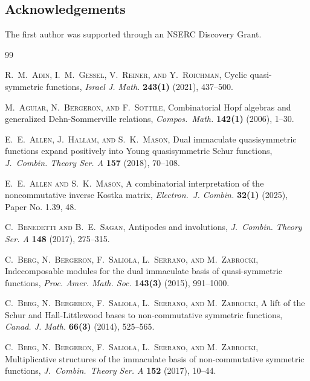 \documentclass{amsart}
\theoremstyle{definition}
\begin{document}
 \subsection*{Acknowledgements}
 The first author was supported through an NSERC Discovery Grant. 

\begin{thebibliography}{99}

 \textsc{R.\ M.\ Adin, I.\ M.\ Gessel, V.\ Reiner, and Y.\ Roichman}, 
 Cyclic quasi-symmetric functions, 
 \emph{Israel J. Math.} {\bf 243(1)} (2021), 437--500. 

 \textsc{M.\ Aguiar, N.\ Bergeron, and F.\ Sottile}, 
 Combinatorial {H}opf algebras and generalized {D}ehn-{S}ommerville relations, 
 \emph{Compos.\ Math.} {\bf 142(1)} (2006), 1--30. 

 \textsc{E.\ E.\ Allen, J.\ Hallam, and S.\ K.\ Mason}, 
 Dual immaculate quasisymmetric functions expand positively
 into {Y}oung quasisymmetric {S}chur functions, 
 \emph{J.\ Combin. Theory Ser. A} {\bf 157} (2018), 70--108. 

 \textsc{E.\ E.\ Allen and S.\ K.\ Mason}, 
 A combinatorial interpretation of the noncommutative inverse {K}ostka matrix, 
 \emph{Electron.\ J. Combin.} {\bf 32(1)} (2025), Paper No. 1.39, 48. 

 \textsc{C.\ Benedetti and B.\ E.\ Sagan}, 
 Antipodes and involutions, 
 \emph{J.\ Combin. Theory Ser. A} {\bf 148} (2017), 275--315. 

 \textsc{C.\ Berg, N.\ Bergeron, F.\ Saliola, L.\ Serrano, and M.\ Zabrocki}, 
 Indecomposable modules for the dual immaculate basis of
 quasi-symmetric functions, 
 \emph{Proc. Amer. Math. Soc.} {\bf 143(3)} (2015), 991--1000. 

 \textsc{C.\ Berg, N.\ Bergeron, F.\ Saliola, L.\ Serrano, and M.\ Zabrocki}, 
 A lift of the Schur and {H}all-{L}ittlewood bases to
 non-commutative symmetric functions, 
 \emph{Canad. J. Math.} {\bf 66(3)} (2014), 525--565. 

 \textsc{C.\ Berg, N.\ Bergeron, F.\ Saliola, L.\ Serrano, and M.\ Zabrocki}, 
 Multiplicative structures of the immaculate basis of non-commutative symmetric functions, 
 \emph{J.\ Combin.\ Theory Ser. A} {\bf 152} (2017), 10--44. 


\end{thebibliography}
\end{document}
